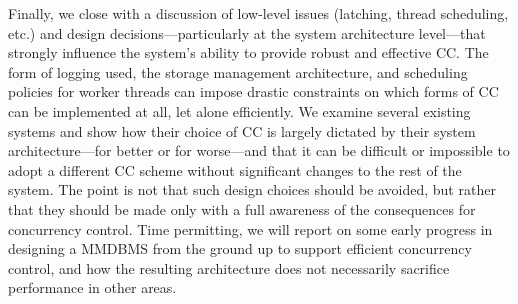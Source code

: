\documentclass[preprint]{sig-alternate-nocprt}
\begin{document}
Finally, we close with a discussion of low-level issues (latching, thread scheduling, etc.) and design decisions---particularly at the system architecture level---that strongly influence the system's ability to provide robust and effective CC. The form of logging used, the storage management architecture, and scheduling policies for worker threads can impose drastic constraints on which forms of CC can be implemented at all, let alone efficiently. We examine several existing systems and show how their choice of CC is largely dictated by their system architecture---for better or for worse---and that it can be difficult or impossible to adopt a different CC scheme without significant changes to the rest of the system. The point is not that such design choices should be avoided, but rather that they should be made only with a full awareness of the consequences for concurrency control. Time permitting, we will report on some early progress in designing a MMDBMS from the ground up to support efficient concurrency control, and how the resulting architecture does not necessarily sacrifice performance in other areas.



\end{document}
